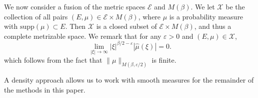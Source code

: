 \documentclass[12pt,reqno]{article}
\numberwithin{equation}{section}
\newtheorem{theorem}{Theorem}
\begin{document}
We now consider a fusion of the metric spaces $\mathcal{E}$ and $M(\beta)$. We let $\mathcal{X}$ be the collection of all pairs $(E,\mu) \in \mathcal{E} \times M(\beta)$, where $\mu$ is a probability measure with $\text{supp}(\mu) \subset E$. Then $\mathcal{X}$ is a closed subset of $\mathcal{E} \times M(\beta)$, and thus a complete metrizable space. We remark that for any $\varepsilon > 0$ and $(E,\mu) \in \mathcal{X}$,
%
\begin{equation} \label{equationGFSCSC4}
    \lim_{|\xi| \to \infty} |\xi|^{\beta/2 - \varepsilon} |\widehat{\mu}(\xi)| = 0.
\end{equation}
%
which follows from the fact that $\| \mu \|_{M(\beta,\varepsilon/2)}$ is finite.
\begin{comment}
\begin{theorem}
    $\mathcal{X}$ is a closed subset of $\mathcal{E} \times M(\beta)$.
\end{theorem}
\begin{proof}
    Suppose $\{ (E_k,\mu_k) \}$ is a sequence of elements of $\mathcal{X}$ converging to some tuple $(E,\mu) \in \mathcal{E} \times M(\beta)$. Fix $\varepsilon > 0$. Since $E_k \to E$ in the Hausdorff dimension, there exists $k_0$ such that for $k \geq k_0$, $E_k \subset E(\varepsilon)$. Since $\mu_k \to \mu$ weakly, this implies that $\mu$ is a probability measure, and that $\text{supp}(\mu) \subset E(\varepsilon)$. Taking $\varepsilon \to 0$ shows that $\text{supp}(\mu) \subset E$. Again for a fixed $\varepsilon > 0$, applying the triangle inequality and the reverse triangle inequality combined with \eqref{equationGFSCSC4} applied to $\mu_k$, we conclude
    \[ \lim_{|\xi| \to \infty} |\xi|^{\beta/2 - \varepsilon} |\widehat{\mu}(\xi)| = \lim_{|\xi| \to \infty} |\xi|^{\beta/2 - \varepsilon} |\widehat{\mu}(\xi) - \widehat{\mu_k}(\xi)| \leq \| \mu - \mu_k \|_{M(\beta,\varepsilon)}. \]
    Taking $k \to \infty$ shows that
    \[ \lim_{|\xi| \to \infty} |\xi|^{\beta/2 - \varepsilon} |\widehat{\mu}(\xi)| = 0, \]
    which completes the proof.
\end{proof}
\end{comment}

A density approach allows us to work with smooth measures for the remainder of the methods in this paper.
\end{document}
